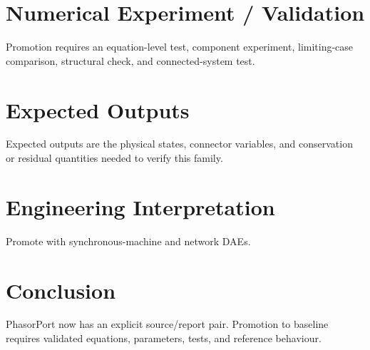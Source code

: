 \documentclass[10pt,a4paper]{article}
\begin{document}
\section{Numerical Experiment / Validation}
Promotion requires an equation-level test, component experiment, limiting-case comparison, structural check, and connected-system test.
\section{Expected Outputs}
Expected outputs are the physical states, connector variables, and conservation or residual quantities needed to verify this family.
\section{Engineering Interpretation}
Promote with synchronous-machine and network DAEs.
\section*{Conclusion}
PhasorPort now has an explicit source/report pair. Promotion to baseline requires validated equations, parameters, tests, and reference behaviour.
\end{document}
